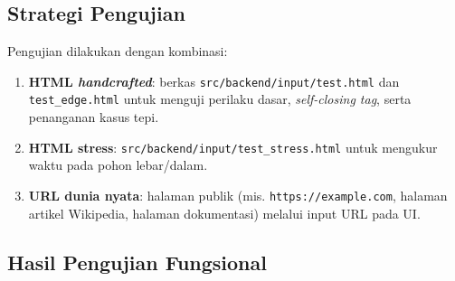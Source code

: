 \subsection{Strategi Pengujian}
Pengujian dilakukan dengan kombinasi:
\begin{enumerate}
    \item \textbf{HTML \textit{handcrafted}}: berkas \texttt{src/backend/input/test.html} dan \texttt{test\_edge.html} untuk menguji perilaku dasar, \textit{self-closing tag}, serta penanganan kasus tepi.
    \item \textbf{HTML stress}: \texttt{src/backend/input/test\_stress.html} untuk mengukur waktu pada pohon lebar/dalam.
    \item \textbf{URL dunia nyata}: halaman publik (mis. \texttt{https://example.com}, halaman artikel Wikipedia, halaman dokumentasi) melalui input URL pada UI.
\end{enumerate}

\subsection{Hasil Pengujian Fungsional}

